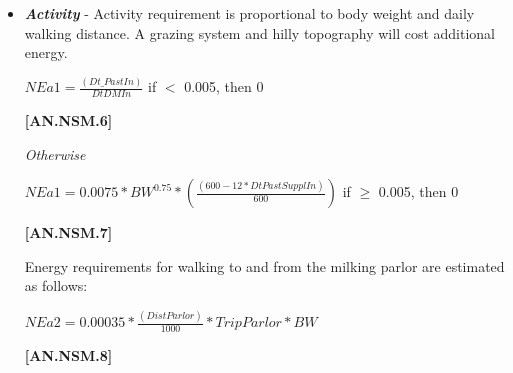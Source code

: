 \begin{refsection}
\begin{itemize}
\begin{center}
    \(CBW = MW * 0.06275\)
\end{center}
\vspace{0.5cm}
            {\raggedleft \textbf{[AN.NSM.4]}\par}

        \vspace{0.2cm}
        \underline {Heifers}
        For heifers, the maintenance energy requirement is only adjusted for the gravid uterine weight:
        \vspace{0.25cm}

    
\begin{center}
    \(NEmain = 0.10 * (BW - GrUterW)^{0.75}\)
\end{center}
\vspace{0.5cm}
            {\raggedleft \textbf{[AN.NSM.5]}\par}
\vspace{0.25cm}

        \item \textbf{\textit {Activity}} - Activity requirement is proportional to body weight and daily walking distance. A grazing system and hilly topography will cost additional energy. 
        \vspace{0.25cm}

    
\begin{center}
    \(NEa1 = \frac{(Dt\_PastIn)}{DtDMIn}\) if $<$ 0.005, then 0
\end{center}
\vspace{0.5cm}
            {\raggedleft \textbf{[AN.NSM.6]}\par}
            \vspace{0.2cm}
            
\textit{\small Otherwise}

\begin{center}
    \(NEa1 = 0.0075 * BW^{0.75} * ( \frac{(600 - 12 * DtPastSupplIn)}{600})\) if \( \geq \) 0.005, then 0
\end{center}
\vspace{0.5cm}
            {\raggedleft \textbf{[AN.NSM.7]}\par}
            \vspace{0.2cm}

Energy requirements for walking to and from the milking parlor are estimated as follows:
        \vspace{0.25cm}

    
\begin{center}
    \(NEa2 = 0.00035 * \frac{(DistParlor)}{1000} * TripParlor * BW\) 
\end{center}
\vspace{0.5cm}
            {\raggedleft \textbf{[AN.NSM.8]}\par}
            \vspace{0.2cm}


\end{itemize}
\end{refsection}
